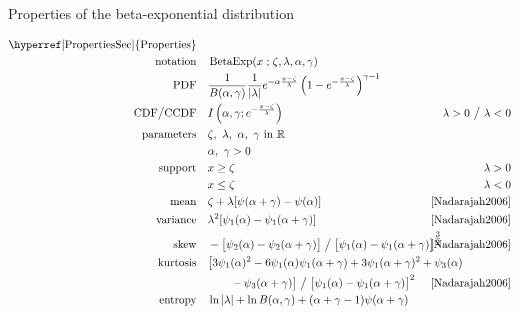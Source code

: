 

\begin{table*}[tp!]
\caption[Beta-exponential distribution -- Properties]{Properties of the beta-exponential distribution}
\begin{align*}
\text{\hyperref[PropertiesSec]{Properties}}  \quad& \\
\text{notation} \quad & \op{BetaExp}(x\given \pLoc,\pScale,\alpha, \gamma)  \checked
\\
\text{PDF}\quad &   \frac{1}{B(\alpha, \gamma)} \frac{1}{|\pScale|} e^{-\alpha \frac{x-\pLoc}{\pScale} }  \left(1 - e^{-\frac{x-\pLoc}{\pScale}  }\right)^{\gamma-1}  \checked
\\
\text{CDF} \big/ \text{CCDF} \quad  & I\left(\alpha,\gamma; e^{-\frac{x-\pLoc}{\pScale}} \right)\checked & \hspace{-2em}\pScale>0 \ \big/ \ \pScale<0
\\
\text{parameters}\quad &   \pLoc,\ \pScale,\ \alpha,\  \gamma \text{ in } \Real	\checked \\
& \alpha,\ \gamma >0	\checked
\\
\text{support} \quad &     x \geq \pLoc \checked&  \pScale > 0
\\
&   x\leq \pLoc  \checked&  \pScale < 0 
\\
\text{mean} \quad  &  \pLoc+ \pScale [\psi(\alpha+\gamma) -\psi(\alpha)  ]  \checked & \text{\cite{Nadarajah2006}}
\\
\text{variance} \quad  & \pScale^2 [\psi_1(\alpha)-\psi_1(\alpha+\gamma) ]  \checked & \text{\cite{Nadarajah2006}}
\\
\text{skew} \quad  &-\bigl[{\psi_2(\alpha)-\psi_2(\alpha+\gamma)}\bigr] \bigm/ {  \bigl[\psi_1(\alpha)-\psi_1(\alpha+\gamma) \bigr]^{\tfrac{3}{2}} } \checked \hspace{-2em} &  \text{\cite{Nadarajah2006}}
\\
\text{kurtosis} \quad  &
\bigl[3\psi_1(\alpha)^2- 6\psi_1(\alpha)\psi_1(\alpha+\gamma)+ 3\psi_1(\alpha+\gamma)^2+\psi_3(\alpha)
\hspace{-4em} \\ &\qquad -\psi_3(\alpha+\gamma)\bigr] \bigm/ \bigl[ \psi_1(\alpha)-\psi_1(\alpha+\gamma) \bigr]^2
\checked	
 				&  \text{\cite{Nadarajah2006}}
\\
\text{entropy} \quad  & \ln |\pScale| +\ln B(\alpha,\gamma) + (\alpha+\gamma-1) \psi(\alpha+\gamma) 

\end{align*}
\end{table*}
